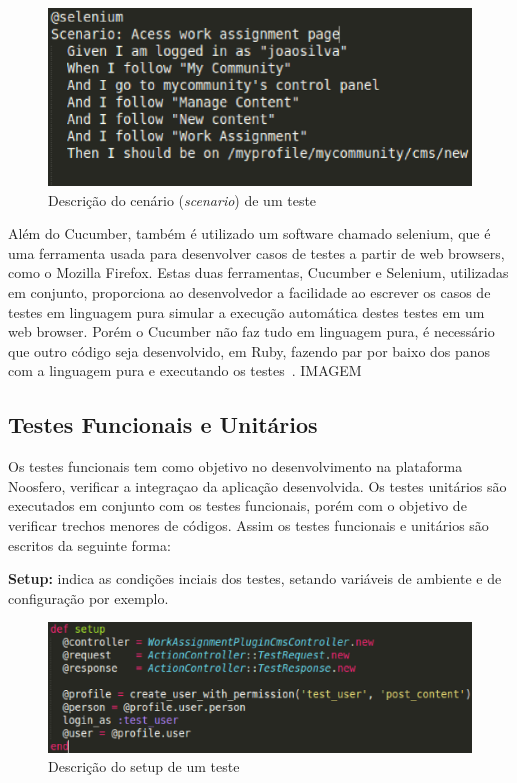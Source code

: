 \begin{enumerate}
\begin{figure}[!h]
    \centering
    \includegraphics[keepaspectratio=true,scale=0.50]
      {figuras/noosfero_scenario.eps}
    \caption{Descrição do cenário (\textit{scenario}) de um teste}
    \label{nosfero_scenario}
\end{figure}

\end{enumerate}
Além do Cucumber, também é utilizado um software chamado selenium, que é uma ferramenta
usada para desenvolver casos de testes a partir de web browsers, como o Mozilla Firefox. 
Estas duas ferramentas, Cucumber e Selenium, utilizadas em conjunto, proporciona ao desenvolvedor
a facilidade ao escrever os casos de testes em linguagem pura simular a execução automática
destes testes em um web browser.
%
Porém o Cucumber não faz tudo em linguagem pura, é necessário que outro código seja desenvolvido,
em Ruby, fazendo par por baixo dos panos com a linguagem pura e executando os testes~\cite{akita2011}.
IMAGEM

\subsection{Testes Funcionais e Unitários}
%
Os testes funcionais tem como objetivo no desenvolvimento na plataforma Noosfero, verificar
a integraçao da aplicação desenvolvida.
%
Os testes unitários são executados em conjunto com os testes funcionais, porém  com o objetivo
de verificar trechos menores de códigos.
%
Assim os testes funcionais e unitários são escritos da seguinte forma:

\textbf{Setup:} indica as condições inciais dos testes, setando variáveis de ambiente e de 
configuração por exemplo.

\begin{figure}[!h]
    \centering
    \includegraphics[keepaspectratio=true,scale=0.50]
      {figuras/teste_setup.eps}
    \caption{Descrição do setup de um teste}
    \label{nosfero_setup}
\end{figure}


